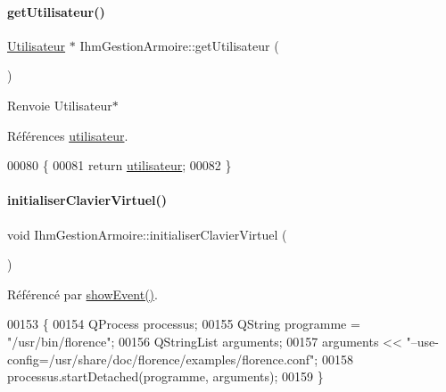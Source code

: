 \paragraph{\texorpdfstring{get\+Utilisateur()}{getUtilisateur()}}
{\footnotesize\ttfamily \hyperlink{class_utilisateur}{Utilisateur} $\ast$ Ihm\+Gestion\+Armoire\+::get\+Utilisateur (\begin{DoxyParamCaption}{ }\end{DoxyParamCaption})}

\begin{DoxyReturn}{Renvoie}
Utilisateur$\ast$ 
\end{DoxyReturn}


Références \hyperlink{class_ihm_gestion_armoire_aa14adf3863cf09947411fc33e413076c}{utilisateur}.


\begin{DoxyCode}
00080 \{
00081     \textcolor{keywordflow}{return} \hyperlink{class_ihm_gestion_armoire_aa14adf3863cf09947411fc33e413076c}{utilisateur};
00082 \}
\end{DoxyCode}
\mbox{\label{class_ihm_gestion_armoire_a189ab3f034720597eedf3930631e6dd1}} 
\paragraph{\texorpdfstring{initialiser\+Clavier\+Virtuel()}{initialiserClavierVirtuel()}}
{\footnotesize\ttfamily void Ihm\+Gestion\+Armoire\+::initialiser\+Clavier\+Virtuel (\begin{DoxyParamCaption}{ }\end{DoxyParamCaption})\hspace{0.3cm}{\ttfamily [private]}}



Référencé par \hyperlink{class_ihm_gestion_armoire_ad0f3d63f9b93fc902de40a9a546f709c}{show\+Event()}.


\begin{DoxyCode}
00153 \{
00154     QProcess processus;
00155     QString programme = \textcolor{stringliteral}{"/usr/bin/florence"};
00156     QStringList arguments;
00157     arguments << \textcolor{stringliteral}{"--use-config=/usr/share/doc/florence/examples/florence.conf"};
00158     processus.startDetached(programme, arguments);
00159 \}
\end{DoxyCode}
\mbox{\label{class_ihm_gestion_armoire_a3bd9b576cab980cae3dc591f412309fc}} 

